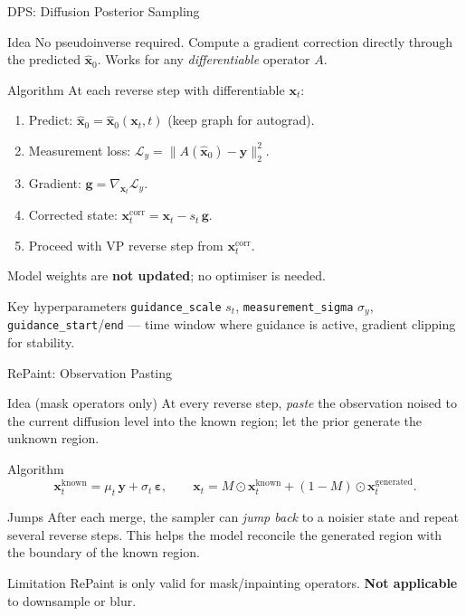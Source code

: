 \documentclass[9pt]{beamer}
\begin{document}

\begin{frame}{DPS: Diffusion Posterior Sampling}
\begin{block}{Idea}
No pseudoinverse required. Compute a gradient correction directly through the predicted $\hat{\mathbf{x}}_0$.
Works for any \emph{differentiable} operator $A$.
\end{block}
\begin{block}{Algorithm}
At each reverse step with differentiable $\mathbf{x}_t$:
\begin{enumerate}
  \item Predict: $\hat{\mathbf{x}}_0 = \hat{\mathbf{x}}_0(\mathbf{x}_t, t)$ (keep graph for autograd).
  \item Measurement loss: $\mathcal{L}_y = \|A(\hat{\mathbf{x}}_0) - \mathbf{y}\|_2^2$.
  \item Gradient: $\mathbf{g} = \nabla_{\mathbf{x}_t}\mathcal{L}_y$.
  \item Corrected state: $\mathbf{x}_t^\text{corr} = \mathbf{x}_t - s_t\,\mathbf{g}$.
  \item Proceed with VP reverse step from $\mathbf{x}_t^\text{corr}$.
\end{enumerate}
Model weights are \textbf{not updated}; no optimiser is needed.
\end{block}
\begin{block}{Key hyperparameters}
\texttt{guidance\_scale} $s_t$, \texttt{measurement\_sigma} $\sigma_y$,
\texttt{guidance\_start}/\texttt{end} — time window where guidance is active,
gradient clipping for stability.
\end{block}
\end{frame}


\begin{frame}{RePaint: Observation Pasting}
\begin{block}{Idea (mask operators only)}
At every reverse step, \emph{paste} the observation noised to the current diffusion level
into the known region; let the prior generate the unknown region.
\end{block}
\begin{block}{Algorithm}
\[
  \mathbf{x}_t^\text{known} = \mu_t\,\mathbf{y} + \sigma_t\,\boldsymbol{\varepsilon},
  \qquad
  \mathbf{x}_t = M \odot \mathbf{x}_t^\text{known} + (1 - M)\odot \mathbf{x}_t^\text{generated}.
\]
\end{block}
\begin{block}{Jumps}
After each merge, the sampler can \emph{jump back} to a noisier state and repeat several
reverse steps. This helps the model reconcile the generated region with the boundary of
the known region.
\end{block}
\begin{alertblock}{Limitation}
RePaint is only valid for mask/inpainting operators.
\textbf{Not applicable} to downsample or blur.
\end{alertblock}
\end{frame}
\end{document}
